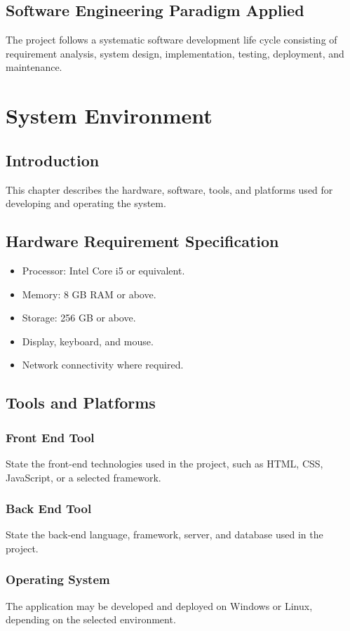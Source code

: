 \documentclass[12pt,a4paper]{report}
\begin{document}
\section{Software Engineering Paradigm Applied}
The project follows a systematic software development life cycle consisting of requirement analysis, system design, implementation, testing, deployment, and maintenance.

\chapter{System Environment}

\section{Introduction}
This chapter describes the hardware, software, tools, and platforms used for developing and operating the system.

\section{Hardware Requirement Specification}
\begin{itemize}
  \item Processor: Intel Core i5 or equivalent.
  \item Memory: 8 GB RAM or above.
  \item Storage: 256 GB or above.
  \item Display, keyboard, and mouse.
  \item Network connectivity where required.
\end{itemize}

\section{Tools and Platforms}
\subsection{Front End Tool}
State the front-end technologies used in the project, such as HTML, CSS, JavaScript, or a selected framework.

\subsection{Back End Tool}
State the back-end language, framework, server, and database used in the project.

\subsection{Operating System}
The application may be developed and deployed on Windows or Linux, depending on the selected environment.
\end{document}
